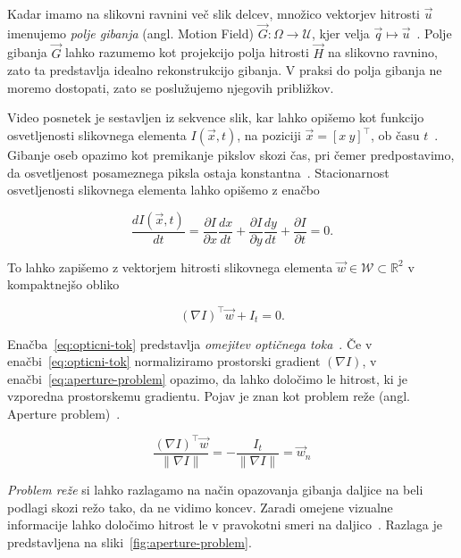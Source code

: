 Kadar imamo na slikovni ravnini več slik delcev, množico vektorjev hitrosti $\vec{u}$ imenujemo \emph{polje gibanja} (angl. Motion Field) $\vec{G} : \varOmega \to \mathcal{U}$, kjer velja $ \vec{q} \mapsto \vec{u}$~\cite{trucco1998introductory}. Polje gibanja $\vec{G}$ lahko razumemo kot projekcijo polja hitrosti $\vec{H}$ na slikovno ravnino, zato ta predstavlja idealno rekonstrukcijo gibanja. V praksi do polja gibanja ne moremo dostopati, zato se poslužujemo njegovih približkov.  

Video posnetek je sestavljen iz sekvence slik, kar lahko opišemo kot funkcijo osvetljenosti slikovnega elementa $I(\vec{x},t)$, na poziciji $\vec{x} = [x~y]^\top$, ob času $t$~\cite{wedel2011stereo}. Gibanje oseb opazimo kot premikanje pikslov skozi čas, pri čemer predpostavimo, da osvetljenost posameznega piksla ostaja konstantna~\cite{trucco1998introductory}. Stacionarnost osvetljenosti slikovnega elementa lahko opišemo z enačbo  

\begin{equation}
	\frac{d I(\vec{x}, t)}{dt} = \frac{\partial I}{\partial x} \frac{dx}{dt} + \frac{\partial I}{\partial y} \frac{dy}{dt} + \frac{\partial I}{\partial t} = 0.
\end{equation}

To lahko zapišemo z vektorjem hitrosti slikovnega elementa $\vec{w} \in \mathcal{W} \subset \mathbb{R}^2$ v kompaktnejšo obliko

\begin{equation}\label{eq:opticni-tok}
	(\nabla I)^\top \vec{w} + I_t = 0.
\end{equation}

Enačba~\eqref{eq:opticni-tok} predstavlja \emph{omejitev optičnega toka}~\cite{trucco1998introductory}. Če v enačbi~\eqref{eq:opticni-tok} normaliziramo prostorski gradient $(\nabla I)$, v enačbi~\eqref{eq:aperture-problem} opazimo, da lahko  določimo le hitrost, ki je vzporedna prostorskemu gradientu. Pojav je znan kot problem reže (angl. Aperture problem)~\cite{trucco1998introductory}. 

\begin{equation}\label{eq:aperture-problem}
	\frac{(\nabla I)^\top \vec{w}}{\| \nabla I \|} = - \frac{I_t}{\| \nabla I \|} = \vec{w}_n
\end{equation}

\emph{Problem reže} si lahko razlagamo na način opazovanja gibanja daljice na beli podlagi skozi režo tako, da ne vidimo koncev. Zaradi omejene vizualne informacije lahko določimo hitrost le v pravokotni smeri na daljico~\cite{trucco1998introductory}. Razlaga je predstavljena na sliki~\ref{fig:aperture-problem}.




